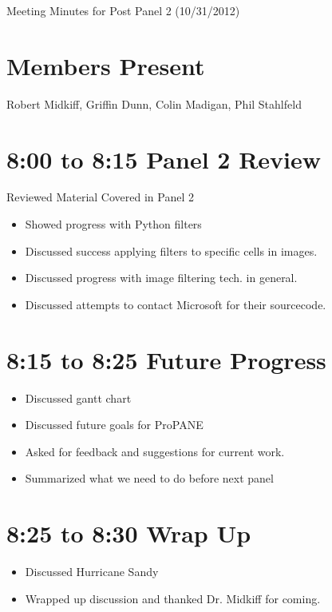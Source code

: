 \documentclass[]{article}
\begin{document}
	Meeting Minutes for Post Panel 2 (10/31/2012)
	
	\section*{Members Present}
		Robert Midkiff, Griffin Dunn, Colin Madigan, Phil Stahlfeld
	\section*{8:00 to 8:15 Panel 2 Review}
		\noindent Reviewed Material Covered in Panel 2
		\begin{itemize}
				\item Showed progress with Python filters
				\item Discussed success applying filters to specific cells in images.
				\item Discussed progress with image filtering tech. in general.
				\item Discussed attempts to contact Microsoft for their sourcecode.
		\end{itemize}
		
	\section*{8:15 to 8:25 Future Progress}
	
			\begin{itemize}
				\item Discussed gantt chart
				\item Discussed future goals for ProPANE
				\item Asked for feedback and suggestions for current work.
				\item Summarized what we need to do before next panel
			\end{itemize}
		
	\section*{8:25 to 8:30 Wrap Up}
		
			\begin{itemize}
				\item Discussed Hurricane Sandy
				\item Wrapped up discussion and thanked Dr. Midkiff for coming.
			\end{itemize}
		
\end{document}
